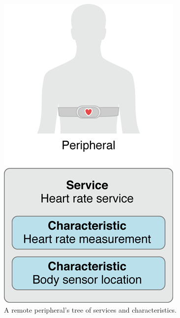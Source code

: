 \documentclass{lab}
\begin{document}
\begin{figure}[h]
    \begin{center}
    \includegraphics[height=0.25\textheight]{images/CBPeripheralData.png} 
    \caption{A remote peripheral’s tree of services and characteristics.}
    \end{center}
\end{figure}
\end{document}
